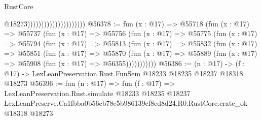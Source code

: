 \begin{lexlean}{RustCore}
\begin{coremodule}
                                              @18273)))))))))))))))))))))
@56378 := fun (x : @17) =>
  @55718
    (fun (x : @17) =>
    @55737
      (fun (x : @17) =>
      @55756
        (fun (x : @17) =>
        @55775
          (fun (x : @17) =>
          @55794
            (fun (x : @17) =>
            @55813
              (fun (x : @17) =>
              @55832
                (fun (x : @17) =>
                @55851
                  (fun (x : @17) =>
                  @55870
                    (fun (x : @17) =>
                    @55889 (fun (x : @17) => @55908 (fun (x : @17) => @56355)))))))))))
@56386 := (n : @17) ->
  (f : @17) -> LexLeanPreservation.Rust.FunSem @18233 @18235 @18237 @18318 @18273
@56396 := fun (n : @17) =>
  fun (f : @17) =>
  LexLeanPreservation.Rust.simulate
    @18233
    @18235
    @18237
    LexLeanPreserve.Ca1fbba0b56cb78e5b986139cf8ed8d24.R0.RustCore.crate_ok
    @18318
    @18273
\end{coremodule}
\end{lexlean}
